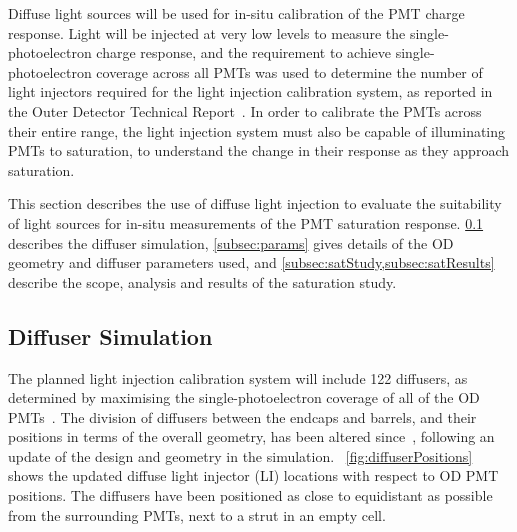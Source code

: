 \documentclass[a4paper,11pt]{article}
\begin{document}
Diffuse light sources will be used for in-situ calibration of the PMT charge response. Light will be injected at very low levels to measure the single-photoelectron charge response, and the requirement to achieve single-photoelectron coverage across all PMTs was used to determine the number of light injectors required for the light injection calibration system, as reported in the Outer Detector Technical Report~\cite{TN64}. In order to calibrate the PMTs across their entire range, the light injection system must also be capable of illuminating PMTs to saturation, to understand the change in their response as they approach saturation. 

This section describes the use of diffuse light injection to evaluate the suitability of light sources for in-situ measurements of the PMT saturation response. \cref{subsec:LIsim} describes the diffuser simulation, \cref{subsec:params} gives details of the OD geometry and diffuser parameters used, and \cref{subsec:satStudy,subsec:satResults} describe the scope, analysis and results of the saturation study.

\subsection{Diffuser Simulation}\label{subsec:LIsim}

The planned light injection calibration system will include 122 diffusers, as determined by maximising the single-photoelectron coverage of all of the OD PMTs~\cite{TN64}. The division of diffusers between the endcaps and barrels, and their positions in terms of the overall geometry, has been altered since~\cite{TN64}, following an update of the design and geometry in the simulation. ~\cref{fig:diffuserPositions} shows the updated diffuse light injector (LI) locations with respect to OD PMT positions. The diffusers have been positioned as close to equidistant as possible from the surrounding PMTs, next to a strut in an empty cell. 
\end{document}
